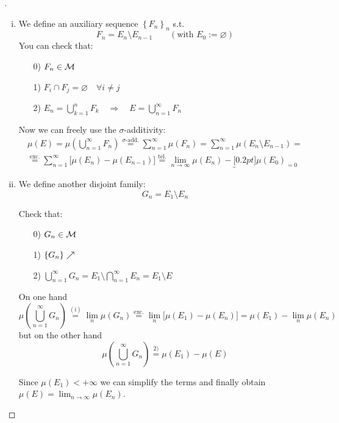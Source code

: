 \begin{proof}[]\leavevmode
\begin{enumerate}[(i)]
\item We define an auxiliary sequence $\left\{ F_n \right\}_n$ s.t. 
\begin{equation*}
F_n=E_n\setminus E_{n-1}\qquad \left( \text{with }E_0:=\varnothing \right)
\end{equation*}
You can check that:
\begin{enumerate}
\item[0)] $F_n\in\mathcal{M}$
\item[1)] $F_i\cap F_j=\varnothing\quad\forall i\neq j$
\item[2)] $\displaystyle E_n=\bigcup_{k=1}^n F_k\quad\Longrightarrow\quad E=\bigcup_{n=1}^\infty F_n$
\end{enumerate}

Now we can freely use the $\sigma$-additivity:
\begin{gather*}
\mu(E)=\mu\left( \bigcup_{n=1}^\infty F_n \right)\overset{\sigma\text{-add.}}{=}\sum^{\infty}_{n=1} \mu\left( F_n \right)=\sum^{\infty}_{n=1} \mu\left( E_n\setminus E_{n-1} \right) =\\
\overset{\text{exc.}}{=}\sum^{\infty}_{n=1} \big[ \mu\left( E_n \right)- \mu\left( E_{n-1} \right) \big] \overset{\text{tel.}}{=}\lim_{n\to\infty}\mu \left( E_n \right)-\underbracket[0.2pt]{\mu \left( E_0 \right)}_{=0}
\end{gather*}

\item We define another disjoint family:
\begin{equation*}
G_n = E_1 \setminus E_n
\end{equation*}

Check that:
\begin{enumerate}
\item[0)] $G_n \in \mathcal{M}$
\item[1)] $\left\{ G_n \right\} \nearrow$
\item[2)] $\displaystyle\bigcup_{n=1}^{\infty} G_n = E_1 \setminus \bigcap_{n=1}^{\infty} E_n = E_1 \setminus E$
\end{enumerate}

On one hand
\begin{equation*}
\mu\left( \bigcup_{n=1}^{\infty} G_n \right) \overset{(\text{i})}{=} \lim_n \mu\left( G_n \right) \overset{\text{exc.}}{=} \lim_n \big[ \mu\left( E_1 \right)- \mu\left( E_{n}\right) \big] = \mu\left( E_1 \right)-\lim_n \mu\left( E_{n} \right)
\end{equation*}
but on the other hand
\begin{equation*}
\mu\left( \bigcup_{n=1}^{\infty} G_n \right) \overset{2)}{=} \mu\left( E_1 \right)-\mu(E)
\end{equation*}

Since $\mu\left( E_1 \right)<+\infty$ we can simplify the terms and finally obtain $\mu ( E) = \displaystyle\lim_{n\to\infty} \mu \left( E_n \right)$.
\end{enumerate}
\end{proof}

